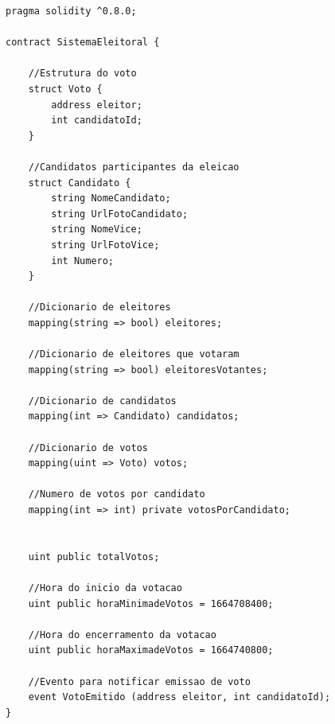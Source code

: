 \documentclass[portuguese]{textolivre}
\begin{document}
\begin{lstlisting}[language=Solidity, label=Codigo-estruturas, caption={Contrato Inteligente desenvolvido utilizando Solidity.}, source={Autor.}]
pragma solidity ^0.8.0;

contract SistemaEleitoral {
	
	//Estrutura do voto
	struct Voto {
		address eleitor;
		int candidatoId;
	}
	
	//Candidatos participantes da eleicao
	struct Candidato {
		string NomeCandidato;
		string UrlFotoCandidato;
		string NomeVice;
		string UrlFotoVice;
		int Numero;
	}
	
	//Dicionario de eleitores
	mapping(string => bool) eleitores;
	
	//Dicionario de eleitores que votaram
	mapping(string => bool) eleitoresVotantes;
	
	//Dicionario de candidatos
	mapping(int => Candidato) candidatos;
	
	//Dicionario de votos
	mapping(uint => Voto) votos;
	
	//Numero de votos por candidato
	mapping(int => int) private votosPorCandidato;
	
	
	uint public totalVotos;
	
	//Hora do inicio da votacao
	uint public horaMinimadeVotos = 1664708400;
	
	//Hora do encerramento da votacao
	uint public horaMaximadeVotos = 1664740800;
	
	//Evento para notificar emissao de voto
	event VotoEmitido (address eleitor, int candidatoId);
}
\end{lstlisting} %
	
\end{document}
